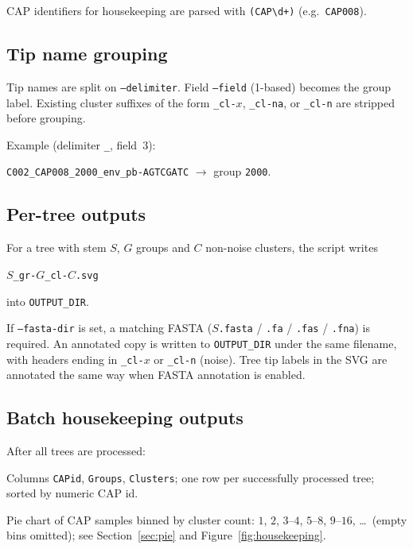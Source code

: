 \documentclass[11pt,a4paper]{article}
\begin{document}
CAP identifiers for housekeeping are parsed with \verb|(CAP\d+)|
(e.g.\ \texttt{CAP008}).

\subsection{Tip name grouping}
Tip names are split on \texttt{--delimiter}. Field \texttt{--field}
(1-based) becomes the group label. Existing cluster suffixes of the form
\texttt{\_cl-}$x$, \texttt{\_cl-na}, or \texttt{\_cl-n} are stripped before
grouping.

Example (delimiter \texttt{\_}, field~$3$):
\begin{center}
\texttt{C002\_CAP008\_2000\_env\_pb-AGTCGATC} $\rightarrow$ group \texttt{2000}.
\end{center}

\subsection{Per-tree outputs}
For a tree with stem $S$, $G$ groups and $C$ non-noise clusters, the script writes
\begin{center}
\texttt{$S$\_gr-}$G$\texttt{\_cl-}$C$\texttt{.svg}
\end{center}
into \texttt{OUTPUT\_DIR}.

If \texttt{--fasta-dir} is set, a matching FASTA
(\texttt{$S$.fasta} / \texttt{.fa} / \texttt{.fas} / \texttt{.fna}) is required.
An annotated copy is written to \texttt{OUTPUT\_DIR} under the same filename,
with headers ending in \texttt{\_cl-}$x$ or \texttt{\_cl-n} (noise).
Tree tip labels in the SVG are annotated the same way when FASTA annotation
is enabled.

\subsection{Batch housekeeping outputs}
After all trees are processed:
\begin{description}[style=nextline]
  \item[\texttt{housekeeping.csv}]
    Columns \texttt{CAPid}, \texttt{Groups}, \texttt{Clusters};
    one row per successfully processed tree; sorted by numeric CAP id.
  \item[\texttt{housekeeping.svg}]
    Pie chart of CAP samples binned by cluster count:
    $1$, $2$, $3$--$4$, $5$--$8$, $9$--$16$, \ldots\
    (empty bins omitted); see Section~\ref{sec:pie} and Figure~\ref{fig:housekeeping}.
\end{description}
\end{document}
